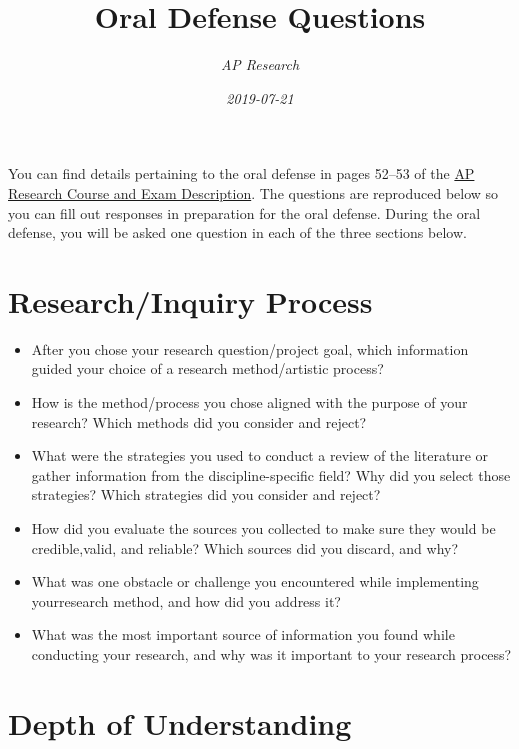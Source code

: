 \documentclass[]{article}
\title{Oral Defense Questions}
\author{\emph{AP Research}}
\date{\emph{2019-07-21}}
\begin{document}
\maketitle

You can find details pertaining to the oral defense in pages 52--53 of
the
\href{https://apcentral.collegeboard.org/pdf/ap-research-course-and-exam-description.pdf?course=ap-research}{AP
Research Course and Exam Description}. The questions are reproduced
below so you can fill out responses in preparation for the oral defense.
During the oral defense, you will be asked one question in each of the
three sections below.

\hypertarget{researchinquiry-process}{%
\section{Research/Inquiry Process}\label{researchinquiry-process}}

\begin{itemize}
\item
  After you chose your research question/project goal, which information
  guided your choice of a research method/artistic process?
\item
  How is the method/process you chose aligned with the purpose of your
  research? Which methods did you consider and reject?
\item
  What were the strategies you used to conduct a review of the
  literature or gather information from the discipline-specific field?
  Why did you select those strategies? Which strategies did you consider
  and reject?
\item
  How did you evaluate the sources you collected to make sure they would
  be credible,valid, and reliable? Which sources did you discard, and
  why?
\item
  What was one obstacle or challenge you encountered while implementing
  yourresearch method, and how did you address it?
\item
  What was the most important source of information you found while
  conducting your research, and why was it important to your research
  process?
\end{itemize}

\hypertarget{depth-of-understanding}{%
\section{Depth of Understanding}\label{depth-of-understanding}}
\end{document}
